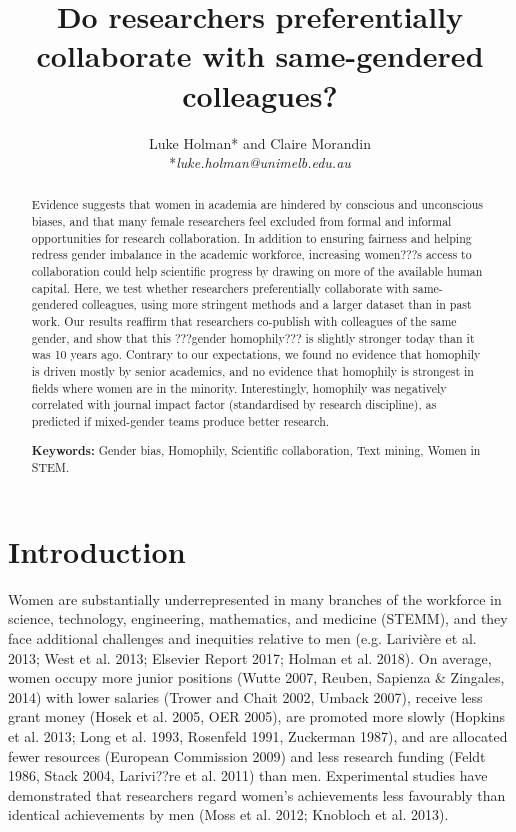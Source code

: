 \documentclass[12pt,]{article}
\title{Do researchers preferentially collaborate with same-gendered colleagues?}
\author{Luke Holman* and Claire Morandin \\ *\textit{luke.holman@unimelb.edu.au} \vspace{5mm}}
\date{}
\begin{document}
\maketitle
\begin{abstract}
Evidence suggests that women in academia are hindered by conscious and
unconscious biases, and that many female researchers feel excluded from
formal and informal opportunities for research collaboration. In
addition to ensuring fairness and helping redress gender imbalance in
the academic workforce, increasing women???s access to collaboration
could help scientific progress by drawing on more of the available human
capital. Here, we test whether researchers preferentially collaborate
with same-gendered colleagues, using more stringent methods and a larger
dataset than in past work. Our results reaffirm that researchers
co-publish with colleagues of the same gender, and show that this
???gender homophily??? is slightly stronger today than it was 10 years
ago. Contrary to our expectations, we found no evidence that homophily
is driven mostly by senior academics, and no evidence that homophily is
strongest in fields where women are in the minority. Interestingly,
homophily was negatively correlated with journal impact factor
(standardised by research discipline), as predicted if mixed-gender
teams produce better research. \vspace{5mm}
\par\noindent \textbf{Keywords:} Gender bias, Homophily, Scientific
collaboration, Text mining, Women in STEM.
\end{abstract}

\maketitle

\newpage

\section{Introduction}\label{introduction}

Women are substantially underrepresented in many branches of the
workforce in science, technology, engineering, mathematics, and medicine
(STEMM), and they face additional challenges and inequities relative to
men (e.g. Larivière et al. 2013; West et al. 2013; Elsevier Report 2017;
Holman et al. 2018). On average, women occupy more junior positions
(Wutte 2007, Reuben, Sapienza \& Zingales, 2014) with lower salaries
(Trower and Chait 2002, Umback 2007), receive less grant money (Hosek et
al. 2005, OER 2005), are promoted more slowly (Hopkins et al. 2013; Long
et al. 1993, Rosenfeld 1991, Zuckerman 1987), and are allocated fewer
resources (European Commission 2009) and less research funding (Feldt
1986, Stack 2004, Larivi??re et al. 2011) than men. Experimental studies
have demonstrated that researchers regard women's achievements less
favourably than identical achievements by men (Moss et al. 2012;
Knobloch et al. 2013).
\end{document}
